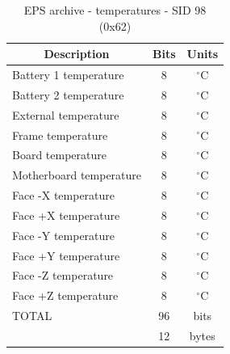 \begin{apendicesenv}
\begin{table}[h]
\centering
\caption{EPS archive - temperatures - SID 98 (0x62)}
\label{my-label}
\begin{tabular}{lcc}
\hline
\multicolumn{1}{c}{Description} & Bits & Units                      \\ \hline
Battery 1 temperature           & 8    & $^{\circ}$C                \\
Battery 2 temperature           & 8    & $^{\circ}$C                \\
External temperature            & 8    & $^{\circ}$C                \\
Frame temperature               & 8    & $^{\circ}$C                \\
Board temperature               & 8    & $^{\circ}$C                \\
Motherboard temperature         & 8    & $^{\circ}$C                \\
Face -X temperature             & 8    & $^{\circ}$C                \\
Face +X temperature             & 8    & $^{\circ}$C                \\
Face -Y temperature             & 8    & $^{\circ}$C                \\
Face +Y temperature             & 8    & $^{\circ}$C                \\
Face -Z temperature             & 8    & $^{\circ}$C                \\
Face +Z temperature             & 8    & $^{\circ}$C                \\ \hline
\multicolumn{1}{|l|}{TOTAL}      & 96   & \multicolumn{1}{c|}{bits}  \\
\multicolumn{1}{|l|}{}           & 12   & \multicolumn{1}{c|}{bytes} \\ \hline
\end{tabular}
\end{table}


\end{apendicesenv}
